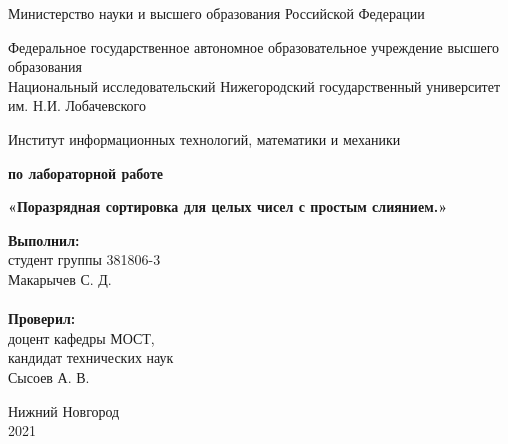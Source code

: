 \documentclass{report}
\begin{document}
\begin{titlepage}

\begin{center}
Министерство науки и высшего образования Российской Федерации
\end{center}

\begin{center}
Федеральное государственное автономное образовательное учреждение высшего образования \\
Национальный исследовательский Нижегородский государственный университет им. Н.И. Лобачевского
\end{center}

\begin{center}
Институт информационных технологий, математики и механики
\end{center}

\vspace{4em}

\begin{center}
\textbf{ по лабораторной работе} \\
\end{center}
\begin{center}
\textbf{\Large«Поразрядная сортировка для целых чисел с простым слиянием.»} \\
\end{center}

\vspace{4em}

\newbox{\lbox}
\newlength{\maxl}
\setlength{\maxl}{\wd\lbox}
\hfill\parbox{7cm}{
\hspace*{5cm}\hspace*{-5cm}\textbf{Выполнил:} \\ студент группы 381806-3 \\ Макарычев С. Д.\\
\\
\hspace*{5cm}\hspace*{-5cm}\textbf{Проверил:}\\ доцент кафедры МОСТ, \\ кандидат технических наук \\ Сысоев А. В.\\
}
\vspace{\fill}

\begin{center} Нижний Новгород \\ 2021 \end{center}

\end{titlepage}
\end{document}
